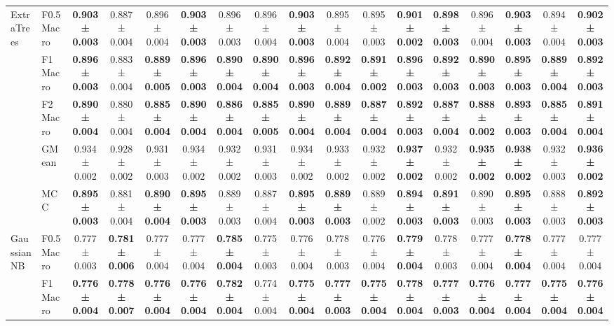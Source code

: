 \begin{table}[H]
{\begin{tabular}{llccccccccccccccc}
\cline{1-17}
\multirow[t]{5}{*}{ExtraTrees} & F0.5 Macro & \textbf{0.903 ± 0.003} & 0.887 ± 0.004 & 0.896 ± 0.004 & \textbf{0.903 ± 0.003} & 0.896 ± 0.003 & 0.896 ± 0.004 & \textbf{0.903 ± 0.003} & 0.895 ± 0.004 & 0.895 ± 0.003 & \textbf{0.901 ± 0.002} & \textbf{0.898 ± 0.003} & 0.896 ± 0.004 & \textbf{0.903 ± 0.003} & 0.894 ± 0.004 & \textbf{0.902 ± 0.003} \\
 & F1 Macro & \textbf{0.896 ± 0.003} & 0.883 ± 0.004 & \textbf{0.889 ± 0.005} & \textbf{0.896 ± 0.003} & \textbf{0.890 ± 0.004} & \textbf{0.890 ± 0.004} & \textbf{0.896 ± 0.003} & \textbf{0.892 ± 0.004} & \textbf{0.891 ± 0.002} & \textbf{0.896 ± 0.003} & \textbf{0.892 ± 0.003} & \textbf{0.890 ± 0.003} & \textbf{0.895 ± 0.003} & \textbf{0.889 ± 0.004} & \textbf{0.892 ± 0.003} \\
 & F2 Macro & \textbf{0.890 ± 0.004} & 0.880 ± 0.004 & \textbf{0.885 ± 0.004} & \textbf{0.890 ± 0.004} & \textbf{0.886 ± 0.004} & \textbf{0.885 ± 0.005} & \textbf{0.890 ± 0.004} & \textbf{0.889 ± 0.004} & \textbf{0.887 ± 0.004} & \textbf{0.892 ± 0.003} & \textbf{0.887 ± 0.004} & \textbf{0.888 ± 0.002} & \textbf{0.893 ± 0.003} & \textbf{0.885 ± 0.004} & \textbf{0.891 ± 0.004} \\
 & GMean & 0.934 ± 0.002 & 0.928 ± 0.002 & 0.931 ± 0.003 & 0.934 ± 0.002 & 0.932 ± 0.002 & 0.931 ± 0.003 & 0.934 ± 0.002 & 0.933 ± 0.002 & 0.932 ± 0.002 & \textbf{0.937 ± 0.002} & 0.932 ± 0.002 & \textbf{0.935 ± 0.002} & \textbf{0.938 ± 0.002} & 0.932 ± 0.003 & \textbf{0.936 ± 0.002} \\
 & MCC & \textbf{0.895 ± 0.003} & 0.881 ± 0.004 & \textbf{0.890 ± 0.004} & \textbf{0.895 ± 0.003} & 0.889 ± 0.003 & 0.887 ± 0.004 & \textbf{0.895 ± 0.003} & \textbf{0.889 ± 0.003} & 0.889 ± 0.002 & \textbf{0.894 ± 0.003} & \textbf{0.891 ± 0.003} & 0.890 ± 0.003 & \textbf{0.895 ± 0.003} & 0.888 ± 0.003 & \textbf{0.892 ± 0.003} \\
\cline{1-17}
\multirow[t]{5}{*}{GaussianNB} & F0.5 Macro & 0.777 ± 0.003 & \textbf{0.781 ± 0.006} & 0.777 ± 0.004 & 0.777 ± 0.004 & \textbf{0.785 ± 0.004} & 0.775 ± 0.003 & 0.776 ± 0.004 & 0.778 ± 0.003 & 0.776 ± 0.004 & \textbf{0.779 ± 0.004} & 0.778 ± 0.003 & 0.777 ± 0.004 & \textbf{0.778 ± 0.004} & 0.777 ± 0.004 & 0.777 ± 0.004 \\
 & F1 Macro & \textbf{0.776 ± 0.004} & \textbf{0.778 ± 0.007} & \textbf{0.776 ± 0.004} & \textbf{0.776 ± 0.004} & \textbf{0.782 ± 0.004} & 0.774 ± 0.004 & \textbf{0.775 ± 0.004} & \textbf{0.777 ± 0.003} & \textbf{0.775 ± 0.004} & \textbf{0.778 ± 0.004} & \textbf{0.777 ± 0.003} & \textbf{0.776 ± 0.004} & \textbf{0.777 ± 0.004} & \textbf{0.775 ± 0.004} & \textbf{0.776 ± 0.004} \\

\end{tabular}}
\end{table}
